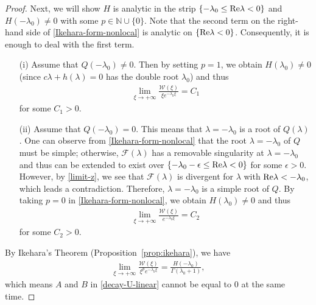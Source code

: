 \documentclass[11pt,a4paper]{article}
\numberwithin{equation}{section}
\numberwithin{figure}{section}
\newcommand\beaa{\begin{eqnarray*}}
\newcommand\eeaa{\end{eqnarray*}}
\begin{document}
\begin{proof}
Next, we will show $H$ is analytic in the strip $\{-\lambda_0\leq  {\rm Re}\lambda<0\}$ and $H(-\lambda_0)\neq 0$ with some $p\in\mathbb{N}\cup\{0\}$.
Note that the second term on the right-hand side of \eqref{Ikehara-form-nonlocal} is analytic on $\{{\rm Re}\lambda<0\}$. 
Consequently, it is enough to deal with the first term. 
\begin{itemize}
    \item[(i)] Assume that
$Q(-\lambda_0)\neq 0$. Then
 by setting $p=1$, we obtain $H(\lambda_0)\neq 0$ (since $c\lambda+h(\lambda)=0$ has the double root $\lambda_0$) and thus
\beaa
\lim_{\xi\to+\infty}\frac{\mathcal{W}(\xi)}{\xi e^{-\lambda_0\xi}}=C_1
\eeaa
for some $C_1>0$.
\item[(ii)] Assume that
$Q(-\lambda_0)=0$. This means that $\lambda=-\lambda_0$ is a root of $Q(\lambda)$.
One can observe from \eqref{Ikehara-form-nonlocal} that the root $\lambda=-\lambda_0$ of $Q$ must be simple; otherwise, $\mathcal{F}(\lambda)$ has a removable singularity at $\lambda=-\lambda_0$ and thus can
be extended to exist over $\{ -\lambda_0-\epsilon\leq  {\rm Re} \lambda<0\}$
for some $\epsilon>0$. However, by \eqref{limit-z}, we see that $\mathcal{F}(\lambda)$ is divergent for
$\lambda$ with ${\rm Re} \lambda<-\lambda_0$,
which leads a contradiction. Therefore, $\lambda=-\lambda_0$ is a simple root of $Q$.
By taking $p=0$ in \eqref{Ikehara-form-nonlocal}, we obtain $H(\lambda_0)\neq 0$ and thus
\beaa
\lim_{\xi\to+\infty}\frac{\mathcal{W}(\xi)}{e^{-\lambda_0\xi}}=C_2
\eeaa
for some $C_2>0$.
\end{itemize}
By Ikehara's Theorem (Proposition~\ref{prop:ikehara}), we have
\beaa
\lim_{\xi\to+\infty}\frac{\mathcal{W}(\xi)}{{\xi}^{p}e^{-\lambda_0\xi}}=\frac{H(-\lambda_0)}{\Gamma(\lambda_0+1)},
\eeaa
which means $A$ and $B$ in \eqref{decay-U-linear} cannot be equal to $0$ at the same time. 
\end{proof}
\end{document}

